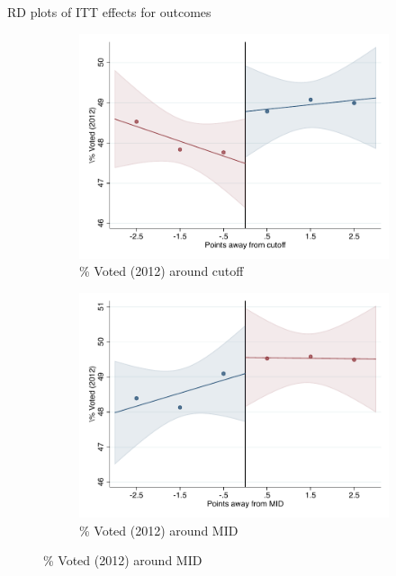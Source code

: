 \documentclass[notes,11pt, aspectratio=169]{beamer}
\begin{document}
\begin{frame}{RD plots of ITT effects for outcomes}
\hyperlink{ITT_rd_plot_IPN}{}
\begin{figure}

    \begin{subfigure}{0.45\textwidth}
        \centering
        \caption{\% Voted (2012) around cutoff}
        \includegraphics[width=\textwidth]{04_Figures/rd_plot_tau_Voto_Marcado_2012_IPN3.pdf}
    \end{subfigure}
    \begin{subfigure}{0.45\textwidth}
        \centering
        \caption{\% Voted (2012) around MID}
        \includegraphics[width=\textwidth]{04_Figures/rd_plot_mid_Voto_Marcado_2012_IPN3.pdf}
    \end{subfigure}
    
\end{figure}
\end{frame}
\end{document}
